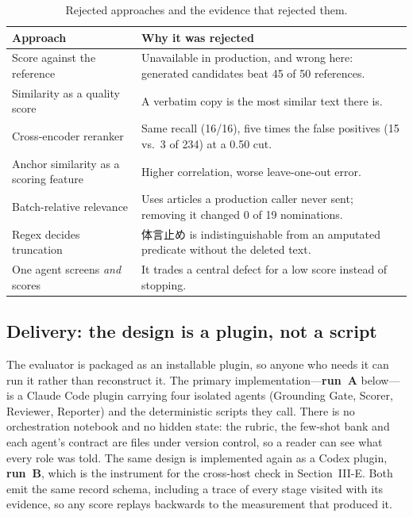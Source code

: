 \documentclass[conference]{IEEEtran}
\begin{document}
\begin{table}[htbp]
\caption{Rejected approaches and the evidence that rejected them.}
\label{tab:rejected}
\centering
\vspace{-0.3cm}
\begin{tabularx}{\columnwidth}{@{}>{\raggedright\arraybackslash{}}p{25mm}Y@{}}
\toprule
\textbf{Approach} & \textbf{Why it was rejected} \\
\midrule
Score against the
reference &
Unavailable in production, and wrong here: generated candidates beat 45 of
50 references. \\
\addlinespace[1pt]
Similarity as a quality score &
A verbatim copy is the most similar text there is. \\
\addlinespace[1pt]
Cross-encoder reranker &
Same recall (16/16), five times the false positives (15 vs.\ 3 of 234)
at a 0.50 cut. \\
\addlinespace[1pt]
Anchor similarity as a scoring feature &
Higher correlation, worse leave-one-out error. \\
\addlinespace[1pt]
Batch-relative relevance &
Uses articles a production caller never sent; removing it changed 0 of
19 nominations. \\
\addlinespace[1pt]
Regex decides truncation &
\mbox{体言止め} is indistinguishable from an amputated predicate
without the deleted text. \\
\addlinespace[1pt]
One agent screens \emph{and} scores &
It trades a central defect for a low score instead of stopping. \\
\bottomrule
\end{tabularx}
\vspace{-0.5cm}
\end{table}

\subsection{Delivery: the design is a plugin, not a script}
The evaluator is packaged as an installable plugin, so anyone who needs it
can run it rather than reconstruct it. The primary
implementation---\textbf{run~A} below---is a Claude Code plugin carrying
four isolated agents (Grounding Gate, Scorer, Reviewer, Reporter) and the
deterministic scripts they call. There is no orchestration notebook and no
hidden state: the rubric, the few-shot bank and each agent's contract are
files under version control, so a reader can see what every role was
told.
The same design is implemented again as a Codex plugin, \textbf{run~B},
which is the instrument for the cross-host check in Section~III-E. Both
emit the same record schema, including a trace of every stage visited with
its evidence, so any score replays backwards to the measurement that
produced it.
\end{document}
